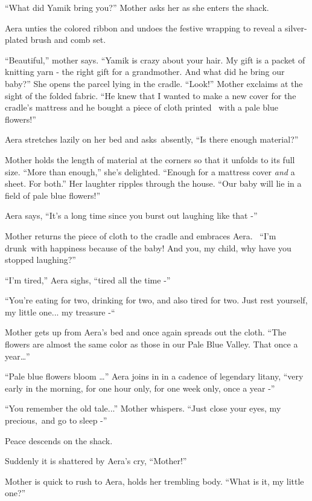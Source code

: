 \documentclass[twoside,11pt]{book}
\begin{document}
``What did Yamik bring you?'' Mother asks her as she enters the shack.

Aera unties the colored ribbon and undoes the festive wrapping to reveal a silver-plated brush and comb set.

``Beautiful,'' mother says. ``Yamik is crazy about your hair. My gift is a packet
of knitting yarn - the right gift for a grandmother. And what did he bring our baby?'' She opens the
parcel lying in the cradle. ``Look!'' Mother exclaims at the sight of the folded fabric.
``He knew that I wanted to make a new cover for the cradle's mattress and he bought a piece of cloth
printed \ with a pale blue flowers!''

Aera stretches lazily on her bed and asks~absently, ``Is there enough material?''

Mother holds the length of material at the corners so that it unfolds to its full size. ``More than
enough,'' she's delighted. ``Enough for a mattress cover \textit{and} a sheet. For
both.'' Her laughter ripples through the house. ``Our baby will lie in a field of pale blue
flowers!''

Aera says, ``It's a long time since you burst out laughing like that -''

Mother returns the piece of cloth to the cradle and embraces Aera. ~``I'm drunk~with happiness because of
the baby! And you, my child, why have you stopped laughing?''

``I'm tired,'' Aera sighs, ``tired all the time -''

``You're eating for two, drinking for two, and also tired for two. Just rest yourself, my little one... my
treasure -``~

Mother gets up from Aera's bed and once again spreads out the cloth. ``The flowers are almost the same
color as those in our Pale Blue Valley. That once a year{\dots}''

``Pale blue flowers bloom {\dots}'' Aera joins in in a cadence of legendary litany,
``very early in the morning, for one hour only, for one week only, once a year -''

``You remember the old tale...'' Mother whispers. ``Just close your eyes, my
precious,~and go to sleep -''

Peace descends on the shack.

Suddenly it is shattered by Aera's cry, ``Mother!''

Mother is quick to rush to Aera, holds her trembling body. ``What is it, my little one?''
\end{document}
